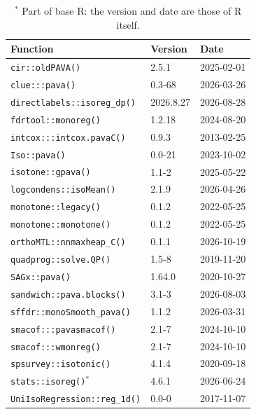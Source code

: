 \documentclass{article}
\begin{document}
\begin{table}[H]
    \centering
    \begin{tabular}{@{}lll@{}}
        \toprule
        Function & Version & Date \\
        \midrule
        \texttt{cir::oldPAVA()} & 2.5.1 & 2025-02-01 \\
        \texttt{clue:::pava()} & 0.3-68 & 2026-03-26 \\
        \texttt{directlabels::isoreg\_dp()} & 2026.8.27 & 2026-08-28 \\
        \texttt{fdrtool::monoreg()} & 1.2.18 & 2024-08-20 \\
        \texttt{intcox:::intcox.pavaC()} & 0.9.3 & 2013-02-25 \\
        \texttt{Iso::pava()} & 0.0-21 & 2023-10-02 \\
        \texttt{isotone::gpava()} & 1.1-2 & 2025-05-22 \\
        \texttt{logcondens::isoMean()} & 2.1.9 & 2026-04-26 \\
        \texttt{monotone::legacy()} & 0.1.2 & 2022-05-25 \\
        \texttt{monotone::monotone()} & 0.1.2 & 2022-05-25 \\
        \texttt{orthoMTL::nnmaxheap\_C()} & 0.1.1 & 2026-10-19 \\
        \texttt{quadprog::solve.QP()} & 1.5-8 & 2019-11-20 \\
        \texttt{SAGx::pava()} & 1.64.0 & 2020-10-27 \\
        \texttt{sandwich::pava.blocks()} & 3.1-3 & 2026-08-03 \\
        \texttt{sffdr::monoSmooth\_pava()} & 1.1.2 & 2026-03-31 \\
        \texttt{smacof:::pavasmacof()} & 2.1-7 & 2024-10-10 \\
        \texttt{smacof:::wmonreg()} & 2.1-7 & 2024-10-10 \\
        \texttt{spsurvey::isotonic()} & 4.1.4 & 2020-09-18 \\
        \texttt{stats::isoreg()}$^{*}$ & 4.6.1 & 2026-06-24 \\
        \texttt{UniIsoRegression::reg\_1d()} & 0.0-0 & 2017-11-07 \\
        \bottomrule
    \end{tabular}
    \caption{Versions of the functions benchmarked}
    \label{tab:versions}
    \captionsetup{font=footnotesize}
    \caption*{
        $^{*}$ Part of base R: the version and date are those of R itself.
    }
\end{table}




\end{document}
